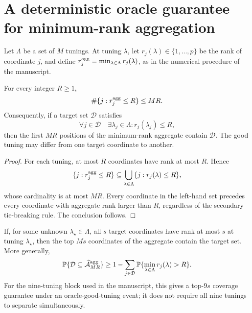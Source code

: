 \section{A deterministic oracle guarantee for minimum-rank aggregation}
\label{sec:new-rank-aggregation}

Let $\Lambda$ be a set of $M$ tunings. At tuning $\lambda$, let
$r_j(\lambda)\in\{1,\ldots,p\}$ be the rank of coordinate $j$, and define
$r_j^{\rm agg}=\min_{\lambda\in\Lambda}r_j(\lambda)$, as in the numerical
procedure of the manuscript.

\begin{proposition}
\label{prop:new-rank-aggregation}
For every integer $R\ge1$,
\[
 \#\{j:r_j^{\rm agg}\le R\}\le MR.
\]
Consequently, if a target set $\mathcal D$ satisfies
\[
 \forall j\in\mathcal D\quad
 \exists\lambda_j\in\Lambda:
 r_j(\lambda_j)\le R,
\]
then the first $MR$ positions of the minimum-rank aggregate contain
$\mathcal D$. The good tuning may differ from one target coordinate to
another.
\end{proposition}

\begin{proof}
For each tuning, at most $R$ coordinates have rank at most $R$. Hence
\[
 \{j:r_j^{\rm agg}\le R\}
 \subseteq\bigcup_{\lambda\in\Lambda}
 \{j:r_j(\lambda)\le R\},
\]
whose cardinality is at most $MR$. Every coordinate in the left-hand set
precedes every coordinate with aggregate rank larger than $R$, regardless
of the secondary tie-breaking rule. The conclusion follows.
\end{proof}

\begin{corollary}
\label{cor:new-rank-oracle}
If, for some unknown $\lambda_\star\in\Lambda$, all $s$ target coordinates
have rank at most $s$ at tuning $\lambda_\star$, then the top $Ms$
coordinates of the aggregate contain the target set. More generally,
\[
 \mathbb P\{\mathcal D\subseteq\widehat{\mathcal A}^{\rm agg}_{MR}\}
 \ge
 1-\sum_{j\in\mathcal D}
 \mathbb P\{\min_{\lambda\in\Lambda}r_j(\lambda)>R\}.
\]
For the nine-tuning block used in the manuscript, this gives a top-$9s$
coverage guarantee under an oracle-good-tuning event; it does not require
all nine tunings to separate simultaneously.
\end{corollary}

